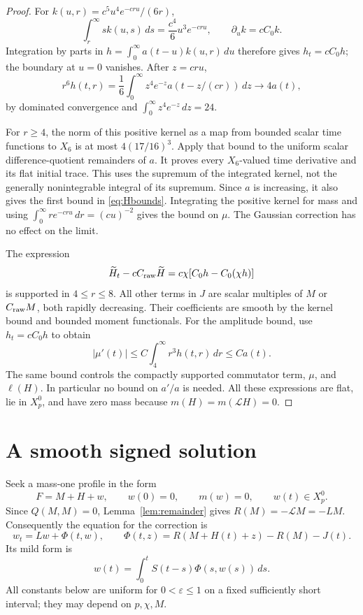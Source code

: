 \documentclass[11pt,a4paper]{article}
\numberwithin{equation}{section}
\theoremstyle{remark}
\newcommand{\calL}{\mathcal L}
\newcommand{\dd}{\,d}
\begin{document}
\begin{proof}
For \(k(u,r)=c^5u^4e^{-cru}/(6r)\),
\[
 \int_r^\infty s k(u,s)\dd s=\frac{c^4}{6}u^3e^{-cru},
 \qquad \partial_u k=cC_0k.
\]
Integration by parts in \(h=\int_0^\infty a(t-u)k(u,r)\dd u\)
therefore gives \(h_t=cC_0h\); the boundary at \(u=0\) vanishes.
After \(z=cru\),
\begin{equation}\label{eq:tail-integral}
 r^6h(t,r)=\frac16\int_0^\infty z^4e^{-z}a(t-z/(cr))\dd z
       \longrightarrow4a(t),
\end{equation}
by dominated convergence and \(\int_0^\infty z^4e^{-z}\dd z=24\).

For \(r\geq4\), the norm of this positive kernel as a map from bounded
scalar time functions to \(X_6\) is at most \(4(17/16)^3\).
Apply that bound to the uniform scalar difference-quotient remainders
of \(a\). It proves every \(X_6\)-valued time derivative and its flat
initial trace. This uses the supremum of the integrated kernel, not
the generally nonintegrable integral of its supremum.
Since \(a\) is increasing, it also gives the first bound in
\eqref{eq:Hbounds}. Integrating the positive kernel for mass and using
\(\int_0^\infty r e^{-cru}\dd r=(cu)^{-2}\) gives the bound on \(\mu\).
The Gaussian correction has no effect on the limit.

The expression
\[
 \widetilde H_t-cC_{\rm raw}\widetilde H
       =c\chi[C_0h-C_0(\chi h)]
\]
is supported in \(4\leq r\leq8\). All other terms in \(J\) are scalar
multiples of \(M\) or \(C_{\rm raw}M\), both rapidly decreasing.
Their coefficients are smooth by the kernel bound and bounded moment
functionals. For the amplitude bound, use \(h_t=cC_0h\) to obtain
\[
 |\mu'(t)|\leq C\int_4^\infty r^3h(t,r)\dd r\leq Ca(t).
\]
The same bound controls the compactly supported commutator term, \(\mu\), and
\(\ell(H)\). In particular no bound on \(a'/a\) is needed.
All these expressions are flat, lie in \(X_p^0\), and have zero mass
because \(m(H)=m(\calL H)=0\).
\end{proof}

\section{A smooth signed solution}\label{sec:signed}

Seek a mass-one profile in the form
\[
 F=M+H+w,\qquad w(0)=0,\qquad m(w)=0,\qquad w(t)\in X_p^0.
\]
Since \(Q(M,M)=0\), Lemma~\ref{lem:remainder} gives
\(R(M)=-\calL M=-LM\). Consequently the equation for the correction is
\begin{equation}\label{eq:w}
 w_t=Lw+\Phi(t,w),\qquad
 \Phi(t,z)=R(M+H(t)+z)-R(M)-J(t).
\end{equation}
Its mild form is
\begin{equation}\label{eq:mild}
 w(t)=\int_0^tS(t-s)\Phi(s,w(s))\dd s.
\end{equation}
All constants below are uniform for \(0<\varepsilon\leq1\) on a fixed
sufficiently short interval; they may depend on \(p,\chi,M\).
\end{document}
